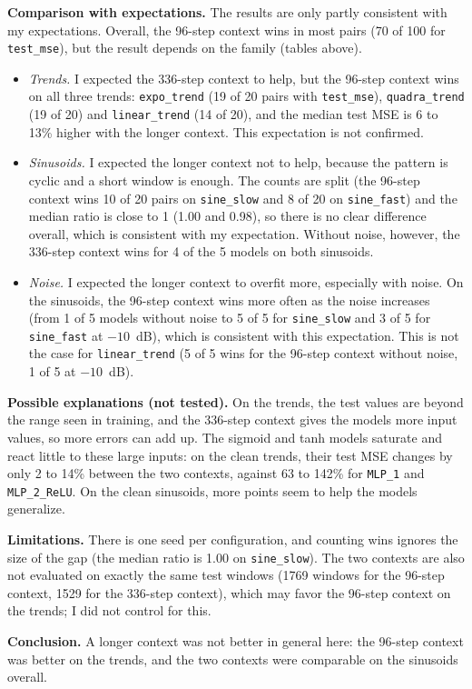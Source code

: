 \documentclass[12pt]{article}
\theoremstyle{definition}
\begin{document}
{\begin{enumerate}[label=\textbf{1.2.\arabic*}, leftmargin=*]
\textbf{Comparison with expectations.} The results are only partly consistent with my expectations. Overall, the 96-step context wins in most pairs (70 of 100 for \texttt{test\_mse}), but the result depends on the family (tables above).
\begin{itemize}[leftmargin=*, itemsep=2pt, topsep=2pt]
\item \emph{Trends.} I expected the 336-step context to help, but the 96-step context wins on all three trends: \texttt{expo\_trend} (19 of 20 pairs with \texttt{test\_mse}), \texttt{quadra\_trend} (19 of 20) and \texttt{linear\_trend} (14 of 20), and the median test MSE is 6 to 13\% higher with the longer context. This expectation is not confirmed.
\item \emph{Sinusoids.} I expected the longer context not to help, because the pattern is cyclic and a short window is enough. The counts are split (the 96-step context wins 10 of 20 pairs on \texttt{sine\_slow} and 8 of 20 on \texttt{sine\_fast}) and the median ratio is close to 1 (1.00 and 0.98), so there is no clear difference overall, which is consistent with my expectation. Without noise, however, the 336-step context wins for 4 of the 5 models on both sinusoids.
\item \emph{Noise.} I expected the longer context to overfit more, especially with noise. On the sinusoids, the 96-step context wins more often as the noise increases (from 1 of 5 models without noise to 5 of 5 for \texttt{sine\_slow} and 3 of 5 for \texttt{sine\_fast} at $-10$~dB), which is consistent with this expectation. This is not the case for \texttt{linear\_trend} (5 of 5 wins for the 96-step context without noise, 1 of 5 at $-10$~dB).
\end{itemize}

\textbf{Possible explanations (not tested).} On the trends, the test values are beyond the range seen in training, and the 336-step context gives the models more input values, so more errors can add up. The sigmoid and tanh models saturate and react little to these large inputs: on the clean trends, their test MSE changes by only 2 to 14\% between the two contexts, against 63 to 142\% for \texttt{MLP\_1} and \texttt{MLP\_2\_ReLU}. On the clean sinusoids, more points seem to help the models generalize.

\textbf{Limitations.} There is one seed per configuration, and counting wins ignores the size of the gap (the median ratio is 1.00 on \texttt{sine\_slow}). The two contexts are also not evaluated on exactly the same test windows (1769 windows for the 96-step context, 1529 for the 336-step context), which may favor the 96-step context on the trends; I did not control for this.

\textbf{Conclusion.} A longer context was not better in general here: the 96-step context was better on the trends, and the two contexts were comparable on the sinusoids overall.

\end{enumerate}
}
\end{document}
